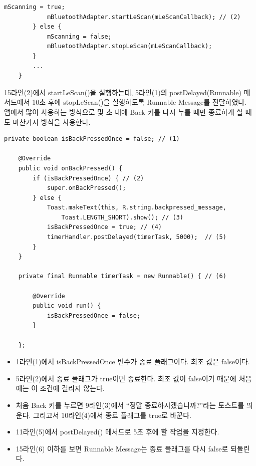 \begin{itemize}
\begin{lstlisting}[frame=single]
	    	mScanning = true;
	    	mBluetoothAdapter.startLeScan(mLeScanCallback); // (2)
	    } else {
	    	mScanning = false;
	    	mBluetoothAdapter.stopLeScan(mLeScanCallback);
	    }
	    ...
	}
\end{lstlisting}
15라인(2)에서 startLeScan()을 실행하는데, 5라인(1)의 postDelayed(Runnable) 메서드에서 10초 후에 stopLeScan()을 실행하도록 Runnable Message를 전달하였다.\\

앱에서 많이 사용하는 방식으로 몇 초 내에 Back 키를 다시 누를 때만 종료하게 할 때도 마찬가지 방식을 사용한다.
\begin{lstlisting}[frame=single] 
	private boolean isBackPressedOnce = false; // (1)
	
	@Override
	public void onBackPressed() {
		if (isBackPressedOnce) { // (2)
			super.onBackPressed();
		} else {
			Toast.makeText(this, R.string.backpressed_message,
				Toast.LENGTH_SHORT).show(); // (3)
			isBackPressedOnce = true; // (4)
			timerHandler.postDelayed(timerTask, 5000);	// (5)		
		}
	}
	
	private final Runnable timerTask = new Runnable() { // (6)
		
		@Override
		public void run() {
			isBackPressedOnce = false;
		}
		
    };
\end{lstlisting}
\begin{itemize}
\item 1라인(1)에서 isBackPressedOnce 변수가 종료 플래그이다. 최초 값은 false이다.
\item 5라인(2)에서 종료 플래그가 true이면 종료한다. 최초 값이 false이기 때문에 처음에는 이 조건에 걸리지 않는다.
\item 처음 Back 키를 누르면 9라인(3)에서 ``정말 종료하시겠습니까?''라는 토스트를 띄운다. 그리고서 10라인(4)에서 종료 플래그를 true로 바꾼다.
\item 11라인(5)에서 postDelayed() 메서드로 5초 후에 할 작업을 지정한다.
\item 15라인(6) 이하를 보면 Runnable Message는 종료 플래그를 다시 false로 되돌린다.
\end{itemize}

\end{itemize}

